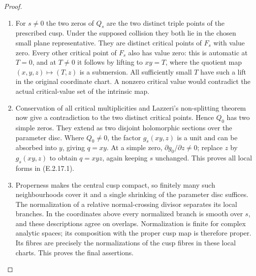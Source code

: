 \begin{proof}
\begin{enumerate}[label={$\langle1\rangle$\arabic*.},leftmargin=*]
\item For $s\ne0$ the two zeros of $Q_s$
are the two distinct triple points
of the prescribed cusp.  Under the
supposed collision they both lie
in the chosen small plane
representative.  They are distinct
critical points of $F_s$ with value
zero.  Every other critical point
of $F_s$ also has value zero:
this is automatic at $T=0$, and
at $T\ne0$ it follows by lifting
to $xy=T$, where the quotient
map $(x,y,z)\mapsto(T,z)$ is a
submersion.  All sufficiently small
$T$ have such a lift in the original
coordinate chart.  A nonzero
critical value would contradict
the actual critical-value set of
the intrinsic map.

\item Conservation of all critical
multiplicities and Lazzeri's
non-splitting theorem now give a
contradiction to the two distinct
critical points.  Hence $Q_0$ has
two simple zeros.  They extend
as two disjoint holomorphic
sections over the parameter disc.
Where $Q_0\ne0$, the factor
$g_s(xy,z)$ is a unit and can
be absorbed into $y$, giving
$q=xy$.  At a simple zero,
$\partial g_0/\partial z\ne0$;
replace $z$ by $g_s(xy,z)$ to
obtain $q=xyz$, again keeping
$s$ unchanged.  This proves
all local forms in (E.2.17.1).

\item Properness makes the central cusp
compact, so finitely many such
neighbourhoods cover it and a
single shrinking of the parameter
disc suffices.  The normalization
of a relative normal-crossing
divisor separates its local
branches.  In the coordinates
above every normalized branch
is smooth over $s$, and these
descriptions agree on overlaps.
Normalization is finite for
complex analytic spaces; its
composition with the proper
cusp map is therefore proper.
Its fibres are precisely the
normalizations of the cusp
fibres in these local charts.
This proves the final assertions.

\end{enumerate}
\end{proof}
